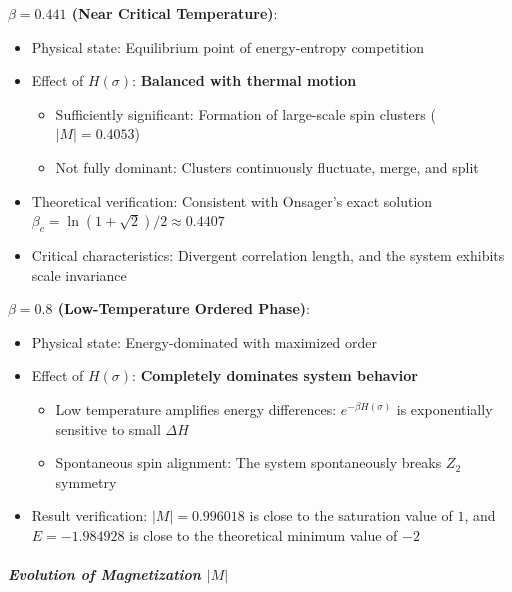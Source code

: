 \documentclass[11pt]{article}
\providecommand{\tightlist}{%
      \setlength{\itemsep}{0pt}\setlength{\parskip}{0pt}}
\begin{document}
\textbf{\(\beta = 0.441\) (Near Critical Temperature)}:

\begin{itemize}
\tightlist
\item
  Physical state: Equilibrium point of energy-entropy competition
\item
  Effect of \(H(\sigma)\): \textbf{Balanced with thermal motion}

  \begin{itemize}
  \tightlist
  \item
    Sufficiently significant: Formation of large-scale spin clusters
    (\(|M|=0.4053\))
  \item
    Not fully dominant: Clusters continuously fluctuate, merge, and
    split
  \end{itemize}
\item
  Theoretical verification: Consistent with Onsager's exact solution
  \(\beta_c  = \ln(1+\sqrt{2})/2 \approx 0.4407\)
\item
  Critical characteristics: Divergent correlation length, and the system
  exhibits scale invariance
\end{itemize}

\textbf{\(\beta = 0.8\) (Low-Temperature Ordered Phase)}:

\begin{itemize}
\tightlist
\item
  Physical state: Energy-dominated with maximized order
\item
  Effect of \(H(\sigma)\): \textbf{Completely dominates system behavior}

  \begin{itemize}
  \tightlist
  \item
    Low temperature amplifies energy differences:
    \(e^{-\beta H(\sigma)}\) is exponentially sensitive to small
    \(\Delta H\)
  \item
    Spontaneous spin alignment: The system spontaneously breaks \(Z_2\)
    symmetry
  \end{itemize}
\item
  Result verification: \(|M|=0.996018\) is close to the saturation value
  of \(1\), and \(E=-1.984928\) is close to the theoretical minimum
  value of \(-2\)
\end{itemize}

\subparagraph{\texorpdfstring{Evolution of Magnetization
\(|M|\)}{Evolution of Magnetization \textbar M\textbar{}}}\label{evolution-of-magnetization-m}
\end{document}
